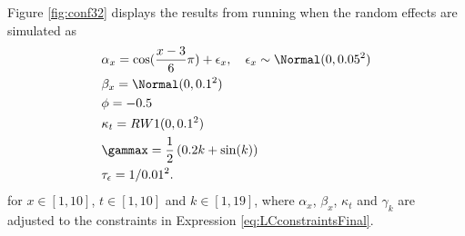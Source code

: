 Figure \ref{fig:conf32} displays the results from running \inlabru when the random effects are simulated as
\begin{equation}
    \begin{aligned}
        &\alpha_x = \cos(\frac{x-3}{6}\pi) + \epsilon_{x}, \quad \epsilon_{x} \sim \Normal(0,0.05^2)\\
        &\beta_x = \Normal(0,0.1^2)\\
        &\phi = -0.5\\
        &\kappa_t = RW1(0,0.1^2)\\
        &\gammax = \frac{1}{2}\left( 0.2k + \sin(k)\right)\\
        &\tau_{\epsilon} = 1/0.01^2.
    \end{aligned}
    \label{eq:conf32}
\end{equation}
for $x\in[1,10]$, $t \in [1,10]$ and $k \in [1,19]$, where $\alpha_x$, $\beta_x$, $\kappa_t$ and $\gamma_k$ are adjusted to the constraints in Expression \ref{eq:LCconstraintsFinal}. 

